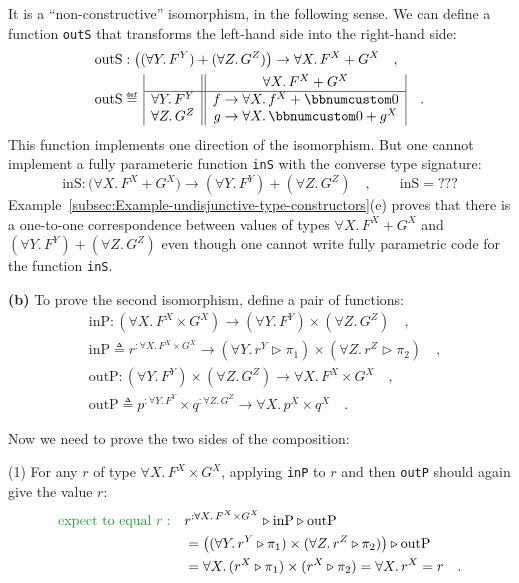 It is a \textsf{``}non-constructive\textsf{''} isomorphism, in the following sense.
We can define a function \lstinline!outS! that transforms the left-hand
side into the right-hand side:
\begin{align*}
 & \text{outS}:\big((\forall Y.\,F^{Y})+(\forall Z.\,G^{Z})\big)\rightarrow\forall X.\,F^{X}+G^{X}\quad,\\
 & \text{outS}\triangleq\,\begin{array}{|c||c|}
 & \forall X.\,F^{X}+G^{X}\\
\hline \forall Y.\,F^{Y} & f\rightarrow\forall X.\,f^{X}+\bbnum 0\\
\forall Z.\,G^{Z} & g\rightarrow\forall X.\,\bbnum 0+g^{X}
\end{array}\quad.
\end{align*}
This function implements one direction of the isomorphism. But one
cannot implement a fully parameteric function \lstinline!inS! with
the converse type signature:
\[
\text{inS}:\big(\forall X.\,F^{X}+G^{X}\big)\rightarrow(\forall Y.\,F^{Y})+(\forall Z.\,G^{Z})\quad,\quad\quad\text{inS}=???
\]
Example~\ref{subsec:Example-undisjunctive-type-constructors}(e)
proves that there is a one-to-one correspondence between values of
types $\forall X.\,F^{X}+G^{X}$ and $(\forall Y.\,F^{Y})+(\forall Z.\,G^{Z})$
even though one cannot write fully parametric code for the function
\lstinline!inS!.

\textbf{(b)} To prove the second isomorphism, define a pair of functions:
\begin{align*}
 & \text{inP}:(\forall X.\,F^{X}\times G^{X})\rightarrow(\forall Y.\,F^{Y})\times(\forall Z.\,G^{Z})\quad,\\
 & \text{inP}\triangleq r^{:\forall X.\,F^{X}\times G^{X}}\rightarrow(\forall Y.\,r^{Y}\triangleright\pi_{1})\times(\forall Z.\,r^{Z}\triangleright\pi_{2})\quad,\\
 & \text{outP}:(\forall Y.\,F^{Y})\times(\forall Z.\,G^{Z})\rightarrow\forall X.\,F^{X}\times G^{X}\quad,\\
 & \text{outP}\triangleq p^{:\forall Y.\,F^{Y}}\times q^{:\forall Z.\,G^{Z}}\rightarrow\forall X.\,p^{X}\times q^{X}\quad.
\end{align*}

Now we need to prove the two sides of the composition:

(1) For any $r$ of type $\forall X.\,F^{X}\times G^{X}$, applying
\lstinline!inP! to $r$ and then \lstinline!outP! should again give
the value $r$:
\begin{align*}
{\color{greenunder}\text{expect to equal }r:}\quad & r^{:\forall X.\,F^{X}\times G^{X}}\triangleright\text{inP}\triangleright\text{outP}\\
 & =\big((\forall Y.\,r^{Y}\triangleright\pi_{1})\times(\forall Z.\,r^{Z}\triangleright\pi_{2})\big)\triangleright\text{outP}\\
 & =\forall X.\,(r^{X}\triangleright\pi_{1})\times(r^{X}\triangleright\pi_{2})=\forall X.\,r^{X}=r\quad.
\end{align*}

